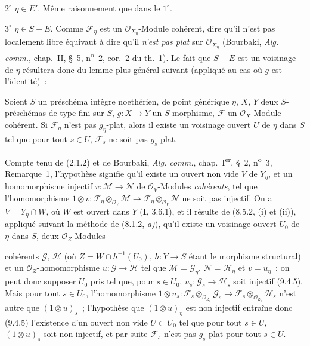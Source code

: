 $2^\circ$ $\eta\in E'$. Même raisonnement que dans le $1^\circ$.

$3^\circ$ $\eta\in S-E$. Comme $\mathcal F_\eta$ est un
$\mathcal O_{X_\eta}$-Module cohérent, dire qu'il n'est pas localement libre
équivaut à dire qu'il \emph{n'est pas plat} sur $\mathcal O_{X_\eta}$
(Bourbaki, \emph{Alg. comm.}, chap.~II, \S~5, n\textsuperscript{o}~2,
cor.~2 du th.~1). Le fait que $S-E$ est un voisinage de $\eta$ résultera donc
du lemme plus général suivant (appliqué au cas où $g$ est l'identité)~:

\begin{lemma}[9.4.7.1]
\label{IV.9.4.7.1-fr}
Soient $S$ un préschéma intègre noethérien, de point générique $\eta$, $X$,
$Y$ deux $S$-préschémas de type fini sur $S$, $g:X\to Y$ un $S$-morphisme,
$\mathcal F$ un $\mathcal O_X$-Module cohérent. Si $\mathcal F_\eta$ n'est
pas $g_\eta$-plat, alors il existe un voisinage ouvert $U$ de $\eta$ dans $S$
tel que pour tout $s\in U$, $\mathcal F_s$ ne soit pas $g_s$-plat.
\end{lemma}

Compte tenu de (2.1.2) et de Bourbaki, \emph{Alg. comm.}, chap.~I\textsuperscript{er},
\S~2, n\textsuperscript{o}~3, Remarque~1, l'hypothèse signifie qu'il existe un
ouvert non vide $V$ de $Y_\eta$, et un homomorphisme injectif
$v:\mathcal M\to\mathcal N$ de $\mathcal O_V$-Modules \emph{cohérents}, tel
que l'homomorphisme
$1\otimes v:\mathcal F_\eta\otimes_{\mathcal O_V}\mathcal M\to
\mathcal F_\eta\otimes_{\mathcal O_V}\mathcal N$ ne soit pas injectif. On a
$V=Y_\eta\cap W$, où $W$ est ouvert dans $Y$ (\textbf{I}, 3.6.1), et il
résulte de (8.5.2, (i) et (ii)), appliqué suivant la méthode de
(8.1.2, \emph{a)}), qu'il existe un voisinage ouvert $U_0$ de $\eta$ dans $S$,
deux $\mathcal O_Z$-Modules


cohérents $\mathcal G$, $\mathcal H$ (où $Z=W\cap h^{-1}(U_0)$,
$h:Y\to S$ étant le morphisme structural) et un $\mathcal O_Z$-homomorphisme
$u:\mathcal G\to\mathcal H$ tel que $\mathcal M=\mathcal G_\eta$,
$\mathcal N=\mathcal H_\eta$ et $v=u_\eta$~; on peut donc supposer $U_0$ pris
tel que, pour $s\in U_0$, $u_s:\mathcal G_s\to\mathcal H_s$ soit injectif
(9.4.5). Mais pour tout $s\in U_0$, l'homomorphisme
$1\otimes u_s:\mathcal F_s\otimes_{\mathcal O_{Z_s}}\mathcal G_s\to
\mathcal F_s\otimes_{\mathcal O_{Z_s}}\mathcal H_s$ n'est autre que
$(1\otimes u)_s$~; l'hypothèse que $(1\otimes u)_\eta$ est non injectif
entraîne donc (9.4.5) l'existence d'un ouvert non vide $U\subset U_0$ tel que
pour tout $s\in U$, $(1\otimes u)_s$ soit non injectif, et par suite
$\mathcal F_s$ n'est pas $g_s$-plat pour tout $s\in U$.

